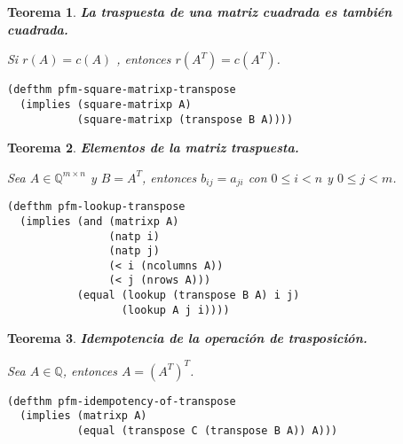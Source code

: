 \documentclass[a4paper,10pt]{article}
\newcommand{\Q}[1]{#1 \in \mathbb{Q}}
\newcommand{\M}[3]{#1 \in \mathbb{Q}^{#2 \times #3}}
\newtheorem{teor}{{Teorema}}
\begin{document}
\par \vspace{16pt}

\begin{teor} \textbf{La traspuesta de una matriz cuadrada es también cuadrada.}\vspace{8pt}\par
Si $r(A) = c(A)$ , entonces $r(A^T) = c(A^T)$.
\end{teor}

\begin{lstlisting}[language=clips]
(defthm pfm-square-matrixp-transpose
  (implies (square-matrixp A)
           (square-matrixp (transpose B A))))
\end{lstlisting}

\par \vspace{16pt}

\begin{teor} \textbf{Elementos de la matriz traspuesta.}\vspace{8pt}\par
Sea $\M{A}{m}{n}$ y $B=A^T$, entonces $b_{ij} = a_{ji}$ con $0 \leq i < n$ y $0 \leq j < m$.
\end{teor}

\begin{lstlisting}[language=clips]
(defthm pfm-lookup-transpose
  (implies (and (matrixp A) 
                (natp i)
                (natp j)
                (< i (ncolumns A))
                (< j (nrows A)))
           (equal (lookup (transpose B A) i j)
                  (lookup A j i))))
\end{lstlisting}

\par \vspace{16pt}

\begin{teor} \textbf{Idempotencia de la operación de trasposición.}\vspace{8pt}\par
Sea $\Q{A}$, entonces $A = (A^T)^T$.
\end{teor}

\begin{lstlisting}[language=clips]
(defthm pfm-idempotency-of-transpose
  (implies (matrixp A)
           (equal (transpose C (transpose B A)) A)))
\end{lstlisting}

\par \vspace{16pt}
\end{document}
